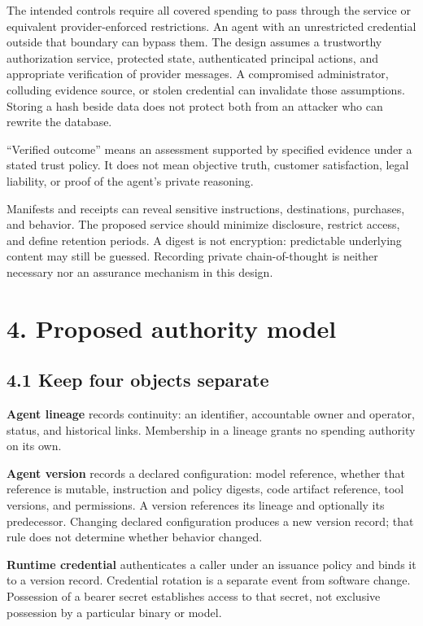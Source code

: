 \documentclass[
  11pt,
  letterpaper,
]{article}
\begin{document}
The intended controls require all covered spending to pass through the
service or equivalent provider-enforced restrictions. An agent with an
unrestricted credential outside that boundary can bypass them. The
design assumes a trustworthy authorization service, protected state,
authenticated principal actions, and appropriate verification of
provider messages. A compromised administrator, colluding evidence
source, or stolen credential can invalidate those assumptions. Storing a
hash beside data does not protect both from an attacker who can rewrite
the database.

``Verified outcome'' means an assessment supported by specified evidence
under a stated trust policy. It does not mean objective truth, customer
satisfaction, legal liability, or proof of the agent's private
reasoning.

Manifests and receipts can reveal sensitive instructions, destinations,
purchases, and behavior. The proposed service should minimize
disclosure, restrict access, and define retention periods. A digest is
not encryption: predictable underlying content may still be guessed.
Recording private chain-of-thought is neither necessary nor an assurance
mechanism in this design.

\section{4. Proposed authority model}\label{proposed-authority-model}

\subsection{4.1 Keep four objects
separate}\label{keep-four-objects-separate}

\textbf{Agent lineage} records continuity: an identifier, accountable
owner and operator, status, and historical links. Membership in a
lineage grants no spending authority on its own.

\textbf{Agent version} records a declared configuration: model
reference, whether that reference is mutable, instruction and policy
digests, code artifact reference, tool versions, and permissions. A
version references its lineage and optionally its predecessor. Changing
declared configuration produces a new version record; that rule does not
determine whether behavior changed.

\textbf{Runtime credential} authenticates a caller under an issuance
policy and binds it to a version record. Credential rotation is a
separate event from software change. Possession of a bearer secret
establishes access to that secret, not exclusive possession by a
particular binary or model.
\end{document}
